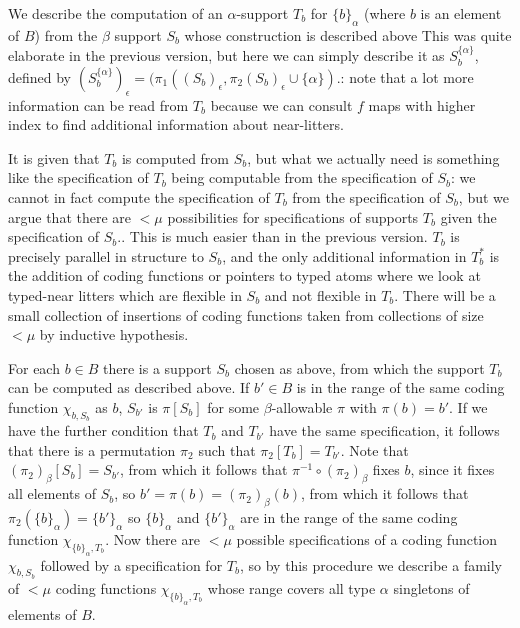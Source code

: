 \documentclass[112pt]{article}
\begin{document}
\begin{description}
We describe the computation of an $\alpha$-support $T_b$
for $\{b\}_\alpha$ (where $b$ is an element of $B$) from the $\beta$ support $S_b$ whose construction is described above   This was quite elaborate in the previous version, but here we can simply describe it as $S_b^{\{\alpha\}}$, defined by $(S_b^{\{\alpha\}})_\epsilon=(\pi_1((S_b)_\epsilon,\pi_2(S_b)_\epsilon \cup \{\alpha\})$.:  note that a lot more information can be read from $T_b$ because
we can consult $f$ maps with higher index to find additional information about near-litters.

It is given that $T_b$ is computed from
$S_b$, but what we actually need is something like the specification of $T_b$ being computable from the specification of $S_b$:  we cannot in fact compute the specification of $T_b$ from the specification of $S_b$, but we argue that there are $<\mu$ possibilities for specifications of supports $T_b$ given the specification of $S_b$..   This is much easier than in the previous version.
$T_b$ is precisely parallel in structure to $S_b$, and the only additional information in $T_b^*$  is the addition of coding functions or pointers to typed atoms where we look at typed-near litters which are flexible in $S_b$ and not flexible in $T_b$.  There will be a small collection of insertions of coding functions taken from collections of size $<\mu$ by inductive hypothesis.



For each $b \in B$ there is a support $S_b$ chosen as above, from which the support $T_b$ can be computed as described above.  If $b' \in B$ is in the range of the same coding function $\chi_{b,S_b}$ as $b$, $S_{b'}$ is $\pi[S_{b}]$ for some $\beta$-allowable $\pi$ with $\pi(b) = b'$.
If we have the further condition that $T_b$ and $T_{b'}$ have the same specification, it follows that there is a permutation $\pi_2$ such that $\pi_2[T_b] = T_{b'}$.  Note that $(\pi_2)_\beta[S_b]=S_{b'}$, from which it follows that $\pi^{-1} \circ (\pi_2)_\beta$ fixes $b$, since it fixes all elements of $S_b$, so $b'=\pi(b) = (\pi_2)_\beta(b)$, from which it follows
that $\pi_2(\{b\}_\alpha) = \{b'\}_\alpha$ so $\{b\}_\alpha$ and $\{b'\}_\alpha$ are in the range of the same coding function $\chi_{\{b\}_\alpha,T_b}$.  Now there are $<\mu$ possible specifications of a coding function $\chi_{b,S_b}$ followed by a specification for $T_b$, so by this procedure we describe a family of $<\mu$ coding functions $\chi_{\{b\}_\alpha,T_b}$ whose range covers all type $\alpha$ singletons of elements of $B$.


\end{description}
\end{document}
